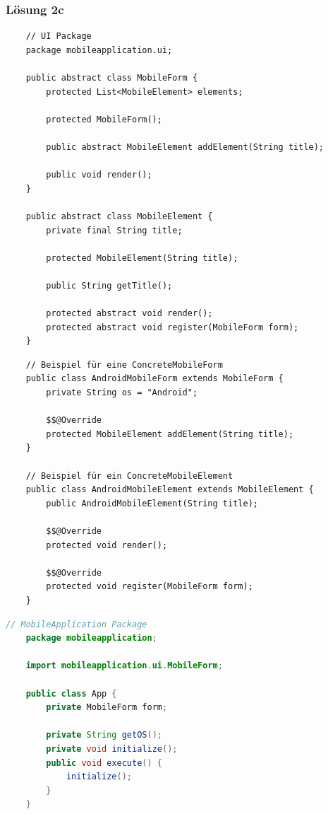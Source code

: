 \documentclass[main.tex]{subfiles}
\begin{document}
\pagebreak
\pagebreak
\subsubsection{Lösung 2c}


\begin{lstlisting}
    // UI Package
    package mobileapplication.ui;

    public abstract class MobileForm {
        protected List<MobileElement> elements;

        protected MobileForm();

        public abstract MobileElement addElement(String title);

        public void render();
    }

    public abstract class MobileElement {
        private final String title;

        protected MobileElement(String title);

        public String getTitle();

        protected abstract void render();
        protected abstract void register(MobileForm form);
    }
\end{lstlisting}

\begin{lstlisting}
    // Beispiel für eine ConcreteMobileForm
    public class AndroidMobileForm extends MobileForm {
        private String os = "Android";

        $$@Override
        protected MobileElement addElement(String title);
    }

    // Beispiel für ein ConcreteMobileElement
    public class AndroidMobileElement extends MobileElement {
        public AndroidMobileElement(String title);

        $$@Override
        protected void render();

        $$@Override
        protected void register(MobileForm form);
    }
\end{lstlisting}

\begin{lstlisting}[language = Java]
    // MobileApplication Package
    package mobileapplication;

    import mobileapplication.ui.MobileForm;

    public class App {
        private MobileForm form;

        private String getOS();
        private void initialize();
        public void execute() {
            initialize();
        }
    }
\end{lstlisting}
\end{document}
